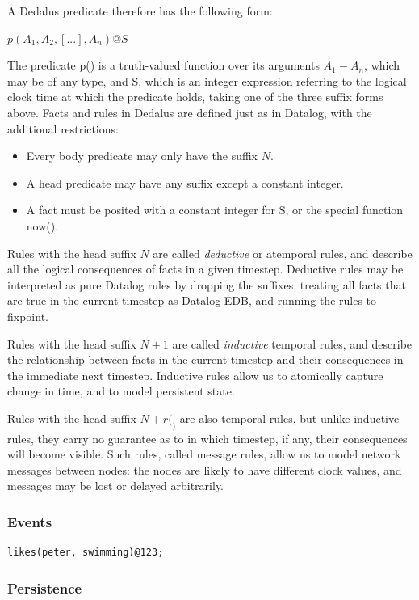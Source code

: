 \documentclass{acm_proc_article-sp-sigmod09}
\begin{document}
A Dedalus predicate therefore has the following form:

$p(A_{1}, A_{2}, [...], A_{n})@S$

The predicate p() is a truth-valued function over its arguments $A_{1} - A_{n}$, which may be of any type, and S, which is an integer expression 
referring to the logical clock time at which the predicate holds, taking one of the three suffix forms above. Facts and rules in Dedalus are 
defined just as in Datalog, with the additional restrictions:

\begin{itemize}
\item Every body predicate may only have the suffix $N$.
\item A head predicate may have any suffix except a constant integer.
\item A fact must be posited with a constant integer for S, or the special function now().
\end{itemize}
Rules with the head suffix $N$ are called \emph{deductive} or atemporal rules, and describe all the logical consequences of facts in a given 
timestep. Deductive rules may be interpreted as pure Datalog rules by dropping the suffixes, treating all facts that are true in the current 
timestep as Datalog EDB, and running the rules to fixpoint.

Rules with the head suffix $N + 1$ are called \emph{inductive} temporal rules, and describe the relationship between facts in the current timestep 
and their consequences in the immediate next timestep. Inductive rules allow us to atomically capture change in time, and to model persistent state.

Rules with the head suffix $N+r(_)$ are also temporal rules, but unlike inductive rules, they carry no guarantee as to in which timestep, if any, 
their consequences will become visible. Such rules, called message rules, allow us to model network messages between nodes: the nodes 
are likely to have different clock values, and messages may be lost or delayed arbitrarily.

\subsubsection{Events}
\begin{verbatim}
likes(peter, swimming)@123;
\end{verbatim}

\subsubsection{Persistence}
\end{document}

